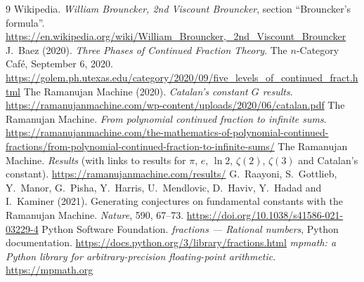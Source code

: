 \documentclass[11pt,a4paper]{article}
\begin{document}
\begin{thebibliography}{9}
   Wikipedia. \emph{William Brouncker, 2nd Viscount
    Brouncker}, section ``Brouncker's formula''.
    \url{https://en.wikipedia.org/wiki/William_Brouncker,_2nd_Viscount_Brouncker}
   J.~Baez (2020). \emph{Three Phases of Continued Fraction
    Theory}. The $n$-Category Caf\'e, September 6, 2020.
    \url{https://golem.ph.utexas.edu/category/2020/09/five_levels_of_continued_fract.html}
   The Ramanujan Machine (2020). \emph{Catalan's constant
    $G$ results}.
    \url{https://ramanujanmachine.com/wp-content/uploads/2020/06/catalan.pdf}
   The Ramanujan Machine. \emph{From polynomial continued
    fraction to infinite sums}.
    \url{https://ramanujanmachine.com/the-mathematics-of-polynomial-continued-fractions/from-polynomial-continued-fraction-to-infinite-sums/}
   The Ramanujan Machine. \emph{Results} (with links to
    results for $\pi$, $e$, $\ln 2$, $\zeta(2)$, $\zeta(3)$ and Catalan's
    constant). \url{https://ramanujanmachine.com/results/}
   G.~Raayoni, S.~Gottlieb, Y.~Manor, G.~Pisha, Y.~Harris,
    U.~Mendlovic, D.~Haviv, Y.~Hadad and I.~Kaminer (2021). Generating
    conjectures on fundamental constants with the Ramanujan Machine.
    \emph{Nature}, 590, 67--73. \url{https://doi.org/10.1038/s41586-021-03229-4}
   Python Software Foundation. \emph{fractions ---
    Rational numbers}, Python documentation.
    \url{https://docs.python.org/3/library/fractions.html}
   \emph{mpmath: a Python library for arbitrary-precision
    floating-point arithmetic}. \url{https://mpmath.org}
\end{thebibliography}
\end{document}
